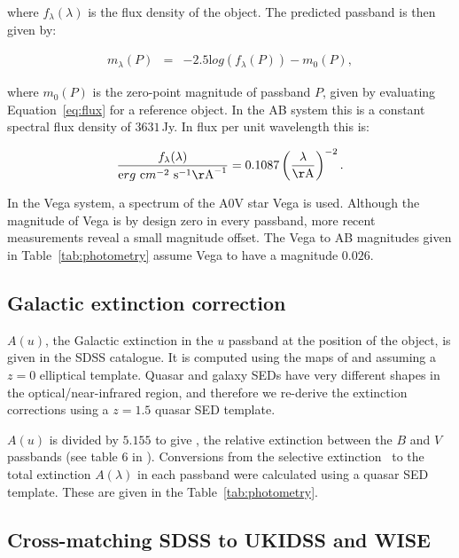 where $f_\lambda(\lambda)$ is the flux density of the object. 
The predicted passband is then given by:   

\begin{eqnarray}
\label{eq:mag}
  m_\lambda(P) & = & -2.5{\mathrm log}(f_\lambda(P)) - m_0(P), 
\end{eqnarray}

where $m_0(P)$ is the zero-point magnitude of passband $P$, given by evaluating Equation~\ref{eq:flux} for a reference object. 
In the AB system this is a constant spectral flux density of $3631$\,Jy. 
In flux per unit wavelength this is:  

\begin{eqnarray}
  \frac{f_\lambda(\lambda)}{{\mathrm erg}~{\mathrm cm}^{-2}~{\mathrm s}^{-1} {\mathrm\AA}^{-1}} = 0.1087 \left(\frac{\lambda}{\mathrm \AA}\right)^{-2}.
\end{eqnarray}

In the Vega system, a spectrum of the A$0$V star Vega is used. 
Although the magnitude of Vega is by design zero in every passband, more recent measurements reveal a small magnitude offset.
The Vega to AB magnitudes given in Table~\ref{tab:photometry} assume Vega to have a magnitude $0.026$. 

\subsection{Galactic extinction correction}

$A(u)$, the Galactic extinction in the $u$ passband at the position of the object, is given in the SDSS catalogue. 
It is computed using the maps of \citet{schlegel98} and assuming a $z=0$ elliptical template. 
Quasar and galaxy SEDs have very different shapes in the optical/near-infrared region, and therefore we re-derive the extinction corrections using a $z=1.5$ quasar SED template. 

$A(u)$ is divided by $5.155$ to give \ebv, the relative extinction between the $B$ and $V$ passbands (see table 6 in \citealt{schlegel98}). 
Conversions from the selective extinction \ebv\, to the total extinction $A(\lambda)$ in each passband were calculated using a quasar SED template. 
These are given in the Table~\ref{tab:photometry}. 

\subsection{Cross-matching SDSS to UKIDSS and WISE}

